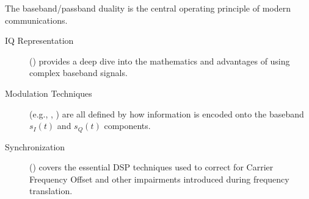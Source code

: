 \begin{importantbox}[title={Further Reading}]
    The baseband/passband duality is the central operating principle of modern communications.
    \begin{description}
        \item[IQ Representation] () provides a deep dive into the mathematics and advantages of using complex baseband signals.
        \item[Modulation Techniques] (e.g., , ) are all defined by how information is encoded onto the baseband $s_I(t)$ and $s_Q(t)$ components.
        \item[Synchronization] () covers the essential DSP techniques used to correct for Carrier Frequency Offset and other impairments introduced during frequency translation.
    \end{description}
\end{importantbox}
